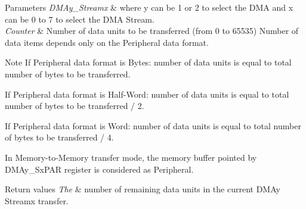 \begin{DoxyParams}{Parameters}
{\em D\+M\+Ay\+\_\+\+Streamx} & where y can be 1 or 2 to select the D\+M\+A and x can be 0 to 7 to select the D\+M\+A Stream. \\
\hline
{\em Counter} & Number of data units to be transferred (from 0 to 65535) Number of data items depends only on the Peripheral data format.\\
\hline
\end{DoxyParams}
\begin{DoxyNote}{Note}
If Peripheral data format is Bytes\+: number of data units is equal to total number of bytes to be transferred.

If Peripheral data format is Half-\/\+Word\+: number of data units is equal to total number of bytes to be transferred / 2.

If Peripheral data format is Word\+: number of data units is equal to total number of bytes to be transferred / 4.

In Memory-\/to-\/\+Memory transfer mode, the memory buffer pointed by D\+M\+Ay\+\_\+\+Sx\+P\+A\+R register is considered as Peripheral.
\end{DoxyNote}

\begin{DoxyRetVals}{Return values}
{\em The} & number of remaining data units in the current D\+M\+Ay Streamx transfer. \\
\hline
\end{DoxyRetVals}
